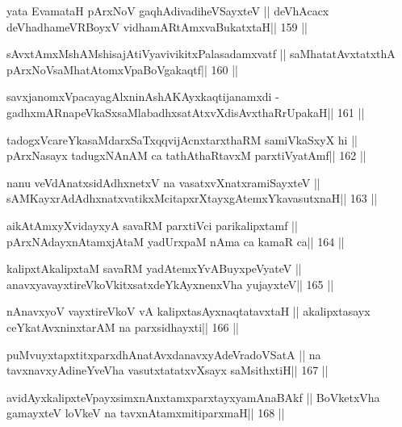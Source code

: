 \begin{shl}
yata EvamataH pArxNoV gaqhAdivadiheVSayxteV ||
deVhAcacx deVhadhameVRBoyxV vidhamARtAmx\s vaBukatxtaH\hfill || 159 ||
\end{shl}

\begin{shl}
sAvxtAmxMshAMshisajAtiVyavivikitxPalasadamxvatf ||
saMhatatAvxtatxthA pArxNoV\s saMhatAtomxVpaBoVgakaqtf\hfill || 160 ||
\end{shl}

\begin{shl}
savxjanomxVpacayagAlxninAshAKAyxkaqtijanamxdi -
gadhxmARnapeVkaSxsaMlabadhxsatAtxvXdisAvxthaRrUpakaH\hfill || 161 ||
\end{shl}

\begin{shl}
tadogxVcareYkasaMdarxSaTxqqvijAcnxtarxthaRM samiVkaSxyX hi ||
pArxNasayx tadugxNAnAM ca tathAthaRtavxM parxtiVyatAmf\hfill || 162 ||
\end{shl}

\begin{shl}
nanu veVdAnatxsidAdhxnetxV na vasatxvXnatxramiSayxteV ||
sAMKayxrAdAdhxnatxvatikxMcitapxrXtayxgAtemxYkavasutxnaH\hfill || 163 ||
\end{shl}

\begin{shl}
aikAtAmxyXvidayxyA savaRM parxtiVci parikalipxtamf ||
pArxNAdayxnAtamxjAtaM yadUrxpaM nAma ca kamaR ca\hfill || 164 ||
\end{shl}

\begin{shl}
kalipxtAkalipxtaM savaRM yadA\s\s temxYvABuyxpeVyateV ||
anavxyavayxtireVkoVkitxsatxdeYkAyxnenxVha yujayxteV\hfill || 165 ||
\end{shl}

\begin{shl}
nAnavxyoV vayxtireVkoV vA kalipxtasAyxnaqtatavxtaH ||
akalipxtasayx ceYkatAvxninxtarAM na parxsidhayxti\hfill || 166 ||
\end{shl}

\begin{shl}
puMvuyxtapxtitxparxdhAnatAvxdanavxyAdeVradoVSatA ||
na tavxnavxyAdineYveVha vasutxtatatxvXsayx saMsithxtiH\hfill || 167 ||
\end{shl}

\begin{shl}
avidAyxkalipxteV\s payxsimxnAnxtamxparxtayxyamAnaBAkf ||
BoVketxVha gamayxteV loVkeV na tavxnAtamxmitiparxmaH\hfill || 168 ||
\end{shl}

